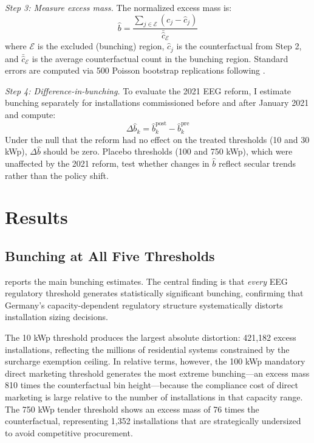 \documentclass[12pt]{article}
\begin{document}
\textit{Step 3: Measure excess mass.} The normalized excess mass is:
\begin{equation}
\hat{b} = \frac{\sum_{j \in \mathcal{E}} (c_j - \hat{c}_j)}{\bar{\hat{c}}_{\mathcal{E}}}
\end{equation}
where $\mathcal{E}$ is the excluded (bunching) region, $\hat{c}_j$ is the counterfactual from Step 2, and $\bar{\hat{c}}_{\mathcal{E}}$ is the average counterfactual count in the bunching region. Standard errors are computed via 500 Poisson bootstrap replications following \citet{ChettyFriedman2011}.

\textit{Step 4: Difference-in-bunching.} To evaluate the 2021 EEG reform, I estimate bunching separately for installations commissioned before and after January 2021 and compute:
\begin{equation}
\Delta \hat{b}_k = \hat{b}_k^{\text{post}} - \hat{b}_k^{\text{pre}}
\end{equation}
Under the null that the reform had no effect on the treated thresholds (10 and 30 kWp), $\Delta \hat{b}$ should be zero. Placebo thresholds (100 and 750 kWp), which were unaffected by the 2021 reform, test whether changes in $\hat{b}$ reflect secular trends rather than the policy shift.


\section{Results}
\label{sec:results}

\subsection{Bunching at All Five Thresholds}

 reports the main bunching estimates. The central finding is that \textit{every} EEG regulatory threshold generates statistically significant bunching, confirming that Germany's capacity-dependent regulatory structure systematically distorts installation sizing decisions.



The 10 kWp threshold produces the largest absolute distortion: 421,182 excess installations, reflecting the millions of residential systems constrained by the surcharge exemption ceiling. In relative terms, however, the 100 kWp mandatory direct marketing threshold generates the most extreme bunching---an excess mass 810 times the counterfactual bin height---because the compliance cost of direct marketing is large relative to the number of installations in that capacity range. The 750 kWp tender threshold shows an excess mass of 76 times the counterfactual, representing 1,352 installations that are strategically undersized to avoid competitive procurement.
\end{document}
